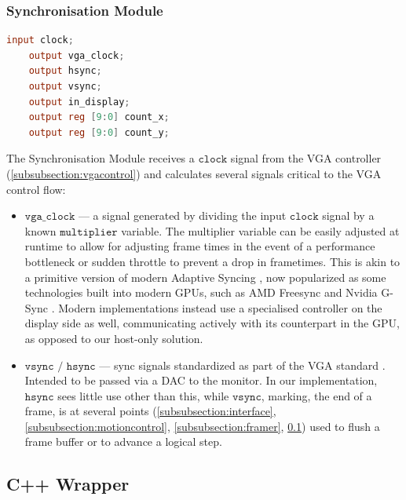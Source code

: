 \subsubsection{Synchronisation Module}
\label{subsubsection:vgasync}
%
\begin{lstlisting}[language=Verilog]
    input clock;
    output vga_clock;
    output hsync;              
    output vsync;               
    output in_display;          
    output reg [9:0] count_x;
    output reg [9:0] count_y;
\end{lstlisting}

The Synchronisation Module receives a \(\texttt{clock}\) signal from
the VGA controller (\ref{subsubsection:vgacontrol}) and calculates several
signals critical to the VGA control flow:

\begin{itemize}
    \item \(\texttt{vga\_clock}\) --- a signal generated by dividing the 
            input \(\texttt{clock}\) signal by a known \(\texttt{multiplier}\)
            variable. The multiplier variable can be easily adjusted at runtime
            to allow for adjusting frame times in the event of a performance
            bottleneck or sudden throttle to prevent a drop in frametimes. This
            is akin to a primitive version of modern Adaptive Syncing \cite{varrefresh},
            now popularized as some technologies built into modern GPUs,
            such as AMD Freesync \cite{freesync} and Nvidia G-Sync \cite{gsync}. 
            Modern implementations instead use a specialised controller on the display
            side as well, communicating actively with its counterpart in the GPU,
            as opposed to our host-only solution.
    \item \(\texttt{vsync / hsync}\) --- sync signals standardized as part of the VGA
            standard \cite{vgastandard}. Intended to be passed via a DAC to the monitor.
            In our implementation, \(\texttt{hsync}\) sees little use other than this,
            while \(\texttt{vsync}\), marking, the end of a frame, is at several points 
            (\ref{subsubsection:interface}, \ref{subsubsection:motioncontrol}, \ref{subsubsection:framer}, 
            \ref{subsection:cppwrap}) used to flush a frame buffer or to advance a logical step.
\end{itemize}


\subsection{C++ Wrapper}
\label{subsection:cppwrap}

